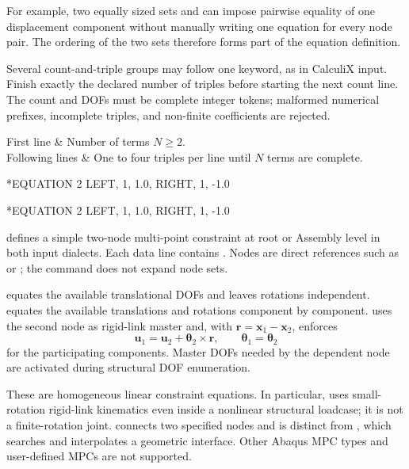 For example, two equally sized sets  and  can impose pairwise equality of one displacement component without manually writing one equation for every node pair. The ordering of the two sets therefore forms part of the equation definition.

Several count-and-triple groups may follow one  keyword, as in CalculiX input. Finish exactly the declared number of triples before starting the next count line. The count and DOFs must be complete integer tokens; malformed numerical prefixes, incomplete triples, and non-finite coefficients are rejected.

\begin{keyworddata}
First line & Number of terms \(N\ge2\). \\
Following lines & One to four  triples per line until \(N\) terms are complete. \\
\end{keyworddata}

\exampleheading
\begin{dialectexamples}
\begin{femasterdeck}
*EQUATION
2
LEFT, 1, 1.0, RIGHT, 1, -1.0
\end{femasterdeck}
\begin{abaqusdeck}
*EQUATION
2
LEFT, 1, 1.0, RIGHT, 1, -1.0
\end{abaqusdeck}
\end{dialectexamples}


 defines a simple two-node multi-point constraint at root or Assembly level in both input dialects. Each data line contains . Nodes are direct references such as  or ; the command does not expand node sets.

 equates the available translational DOFs and leaves rotations independent.  equates the available translations and rotations component by component.  uses the second node as rigid-link master and, with \(\boldsymbol r=\boldsymbol x_1-\boldsymbol x_2\), enforces
\[
\boldsymbol u_1=\boldsymbol u_2+\boldsymbol\theta_2\times\boldsymbol r,
\qquad
\boldsymbol\theta_1=\boldsymbol\theta_2
\]
for the participating components. Master DOFs needed by the dependent node are activated during structural DOF enumeration.

These are homogeneous linear constraint equations. In particular,  uses small-rotation rigid-link kinematics even inside a nonlinear structural loadcase; it is not a finite-rotation joint.  connects two specified nodes and is distinct from , which searches and interpolates a geometric interface. Other Abaqus MPC types and user-defined MPCs are not supported.

